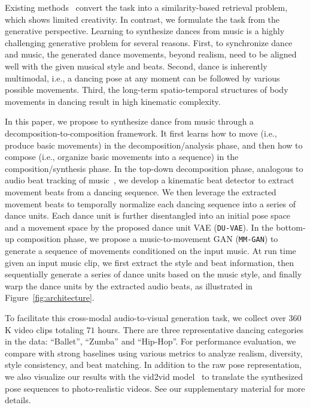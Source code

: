\documentclass{article}
\begin{document}
Existing methods~\cite{fan2012example,lee2013music,ofli2012learn2dance} convert the task into a similarity-based retrieval problem, which shows limited creativity.
In contrast, we formulate the task from the generative perspective. 
Learning to synthesize dances from music is a highly challenging generative problem for several reasons. 
First, to synchronize dance and music, the generated dance movements, beyond realism, need to be aligned well with the given musical style and beats.
Second, dance is inherently multimodal, i.e., a dancing pose at any moment can be followed by various possible movements.
Third, the long-term spatio-temporal structures of body movements in dancing result in high kinematic complexity. 



In this paper, we propose 
to synthesize dance from music through a decomposition-to-composition framework. 
It first learns how to move (i.e., produce basic movements) in the decomposition/analysis phase, and then how to compose (i.e., organize basic movements into a sequence) in the composition/synthesis phase.  
In the top-down decomposition phase, analogous to audio beat tracking of music~\cite{ellis2007beat}, we develop a kinematic beat detector to extract movement beats from a dancing sequence.
We then leverage the extracted movement beats to temporally normalize each dancing sequence into a series of dance units.
Each dance unit is further disentangled into an initial pose space and a movement space by the proposed dance unit VAE (\texttt{DU-VAE}). 
In the bottom-up composition phase, we propose a music-to-movement GAN (\texttt{MM-GAN}) to generate a sequence of movements conditioned on the input music. 
At run time given an input music clip, we first extract the style and beat information, 
then sequentially generate a series of dance units based on the music style, and finally warp the dance units by the extracted audio beats, as illustrated in Figure~\ref{fig:architecture}.
 
To facilitate this cross-modal audio-to-visual generation task, we collect over $360$K video clips totaling $71$ hours. 
There are three representative dancing categories in the data: ``Ballet'', ``Zumba'' and ``Hip-Hop''. 
For performance evaluation, we compare with strong baselines using various metrics to analyze realism, diversity, style consistency, and beat matching.
In addition to the raw pose representation, we also visualize our results with the vid2vid model~\cite{wang2018vid2vid} to translate the synthesized pose sequences to photo-realistic videos. See our supplementary material for more details.
\end{document}

